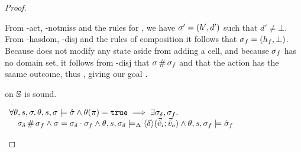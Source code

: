 \begin{proof}
\pfcase{$\alpha=\alloc$}

\begin{hypvlist}
 From \hyp{act}, \hyp{notmiss} and the rules for \alloc{}, we have $\sigma'=(h',d')$ such that $d'\neq\bot$.
 From \hyp{hasdom}, \hyp{disj} and the rules of composition it follows that $\sigma_f=(h_f,\bot)$.
 Because \alloc{} does not modify any state aside from adding a cell, and because $\sigma_f$ has no domain set, it follows from \hyp{disj} that $\sigma\operatorname{\#}\sigma_f$ and that the action has the saame outcome, thus , giving our goal .
\end{hypvlist}


\pfassume \begin{hypvlist}
 
 \consume{} on $\mathbb S$ is sound.
\end{hypvlist}
\pfprove \begin{goalvlist}
 $\begin{array}{l}
\forall \theta,s,\sigma\ldotp \theta,s,\sigma\models \hat{\sigma} \land \theta(\pi)=\texttt{true} \implies \exists \sigma_\delta, \sigma_f \ldotp\\
\quad  \sigma_\delta\operatorname{\#}\sigma_f \land \sigma=\sigma_\delta\cdot\sigma_f \land \theta, s, \sigma_\delta \models_{\Delta} \left<\delta\right>\!(\vec{\hat{v}}_i;\vec{\hat{v}}_o) \land \theta,s,\sigma_f\models \hat{\sigma}_f 
\end{array}$
\end{goalvlist}

\pfcase{$\delta \in \preds_\mmdl$}


\end{proof}
